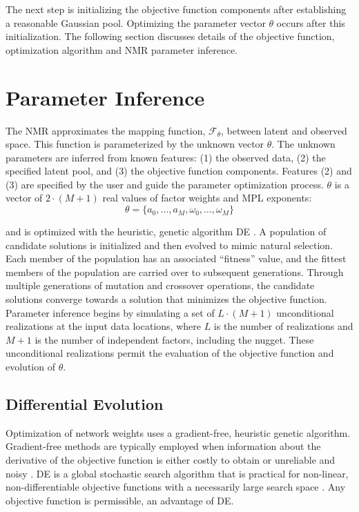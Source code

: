 The next step is initializing the objective function components after establishing a reasonable Gaussian pool. Optimizing the parameter vector $\theta$ occurs after this initialization. The following section discusses details of the objective function, optimization algorithm and \gls{NMR} parameter inference.


\FloatBarrier
\section{Parameter Inference}
\label{sec:04paraminfer}

The \gls{NMR} approximates the mapping function, $\mathcal{F}_{\theta}$, between latent and observed space. This function is parameterized by the unknown vector $\theta$. The unknown parameters are inferred from known features: (1) the observed data, (2) the specified latent pool, and (3) the objective function components. Features (2) and (3) are specified by the user and guide the parameter optimization process. $\theta$ is a vector of $2 \cdot (M+1)$ real values of factor weights and \gls{MPL} exponents:
\begin{equation}
    \theta = \{ a_{0}, \dots, a_{M}, \omega_{0}, \dots, \omega_{M} \}
    \label{eq:theta}
\end{equation}

and is optimized with the heuristic, genetic algorithm \gls{DE} \citep{price2013differential}. A population of candidate solutions is initialized and then evolved to mimic natural selection. Each member of the population has an associated ``fitness'' value, and the fittest members of the population are carried over to subsequent generations. Through multiple generations of mutation and crossover operations, the candidate solutions converge towards a solution that minimizes the objective function. Parameter inference begins by simulating a set of $L \cdot (M+1)$ unconditional realizations at the input data locations, where $L$ is the number of realizations and $M+1$ is the number of independent factors, including the nugget. These unconditional realizations permit the evaluation of the objective function and evolution of $\theta$.

\subsection{Differential Evolution}
\label{subsec:04de}

Optimization of network weights uses a gradient-free, heuristic genetic algorithm. Gradient-free methods are typically employed when information about the derivative of the objective function is either costly to obtain or unreliable and noisy \citep{conn2009introduction}. \Gls{DE} is a global stochastic search algorithm that is practical for non-linear, non-differentiable objective functions with a necessarily large search space \citep{rios2013derivativefree}. Any objective function is permissible, an advantage of \gls{DE}.


